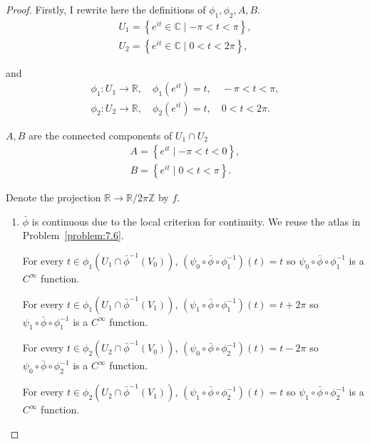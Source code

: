 \begin{proof}
	Firstly, I rewrite here the definitions of \( \phi_{1}, \phi_{2}, A, B \).
	\[
		\begin{split}
			U_{1} = \left\{ e^{it} \in \mathbb{C} \mid -\pi < t < \pi \right\}, \\
			U_{2} = \left\{ e^{it} \in \mathbb{C} \mid 0 < t < 2\pi \right\},
		\end{split}
	\]

	and
	\[
		\begin{split}
			\phi_{1}: U_{1} \to \mathbb{R}, \quad \phi_{1}(e^{it}) = t, \quad -\pi < t < \pi, \\
			\phi_{2}: U_{2} \to \mathbb{R}, \quad \phi_{2}(e^{it}) = t, \quad 0 < t < 2\pi.
		\end{split}
	\]

	\( A, B \) are the connected components of \( U_{1} \cap U_{2} \)
	\[
		\begin{split}
			A = \left\{ e^{it} \mid -\pi < t < 0 \right\}, \\
			B = \left\{ e^{it} \mid 0 < t < \pi \right\}.
		\end{split}
	\]

	Denote the projection \( \mathbb{R} \to \mathbb{R}/2\pi\mathbb{Z} \) by \( f \).

	\begin{enumerate}[label={(\alph*)},leftmargin=*]
		\item \( \bar{\phi} \) is continuous due to the local criterion for continuity. We reuse the atlas in Problem~\ref{problem:7.6}.

		      For every \( t \in \phi_{1}(U_{1} \cap \bar{\phi}^{-1}(V_{0})) \), \( (\psi_{0} \circ \bar{\phi} \circ \phi_{1}^{-1})(t) = t \) so \( \psi_{0} \circ \bar{\phi} \circ \phi_{1}^{-1} \) is a \( C^{\infty} \) function.

		      For every \( t \in \phi_{1}(U_{1} \cap \bar{\phi}^{-1}(V_{1})) \), \( (\psi_{1} \circ \bar{\phi} \circ \phi_{1}^{-1})(t) = t + 2\pi \) so \( \psi_{1} \circ \bar{\phi} \circ \phi_{1}^{-1} \) is a \( C^{\infty} \) function.

		      For every \( t \in \phi_{2}(U_{2} \cap \bar{\phi}^{-1}(V_{0})) \), \( (\psi_{0} \circ \bar{\phi} \circ \phi_{2}^{-1})(t) = t - 2\pi \) so \( \psi_{0} \circ \bar{\phi} \circ \phi_{2}^{-1} \) is a \( C^{\infty} \) function.

		      For every \( t \in \phi_{2}(U_{2} \cap \bar{\phi}^{-1}(V_{1})) \), \( (\psi_{1} \circ \bar{\phi} \circ \phi_{2}^{-1})(t) = t \) so \( \psi_{1} \circ \bar{\phi} \circ \phi_{2}^{-1} \) is a \( C^{\infty} \) function.


\end{enumerate}
\end{proof}
